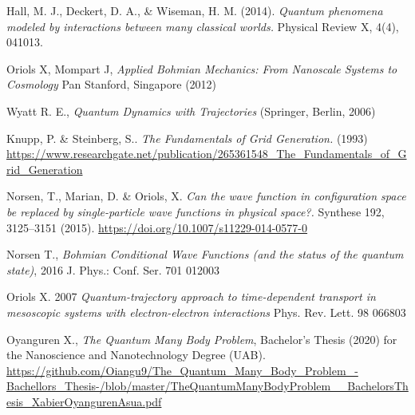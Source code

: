 \documentclass[11pt, a4paper]{article} %
\begin{document}
Hall, M. J., Deckert, D. A., \& Wiseman, H. M. (2014). {\em Quantum phenomena modeled by interactions between many classical worlds.} Physical Review X, 4(4), 041013.



 


\begin{thebibliography}{1}

	Oriols X, Mompart J, {\em Applied Bohmian Mechanics: From Nanoscale Systems to Cosmology} Pan Stanford, Singapore (2012)
	

Wyatt R. E., {\em Quantum Dynamics with Trajectories} (Springer, Berlin, 2006)


Knupp, P. \& Steinberg, S.. {\em The Fundamentals of Grid Generation.} (1993) \href{https://www.researchgate.net/publication/265361548_The_Fundamentals_of_Grid_Generation}{https://www.researchgate.net/publication/265361548\_The\_Fundamentals\_of\_Grid\_Generation} 

Norsen, T., Marian, D. \& Oriols, X. {\em Can the wave function in configuration space be replaced by single-particle wave functions in physical space?.} Synthese 192, 3125–3151 (2015). \href{https://doi.org/10.1007/s11229-014-0577-0}{https://doi.org/10.1007/s11229-014-0577-0}


Norsen T., {\em Bohmian Conditional Wave Functions (and the status of the quantum state)}, 2016 J. Phys.: Conf. Ser. 701 012003

	Oriols X. 2007 {\em Quantum-trajectory approach to time-dependent transport in mesoscopic systems with electron-electron interactions} Phys. Rev. Lett. 98 066803
	
	Oyanguren X., {\em The Quantum Many Body Problem}, Bachelor's Thesis (2020) for the Nanoscience and Nanotechnology Degree (UAB).
\href{https://github.com/Oiangu9/The\_Quantum\_Many\_Body\_Problem\_-Bachellors\_Thesis-/blob/master/TheQuantumManyBodyProblem\_\_BachelorsThesis\_XabierOyangurenAsua.pdf}{https://github.com/Oiangu9/The\_Quantum\_Many\_Body\_Problem\_-Bachellors\_Thesis-/blob/master/TheQuantumManyBodyProblem\_\_BachelorsThesis\_XabierOyangurenAsua.pdf}



\end{thebibliography}
\end{document}
